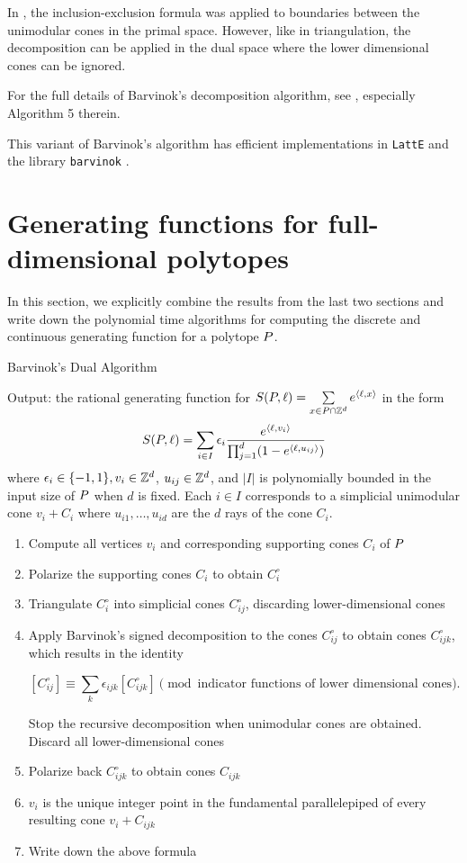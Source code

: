 In \cite{bar}, the inclusion-exclusion formula was applied to boundaries between the unimodular cones in the primal space. However, like in triangulation, the decomposition can be applied in the dual space where the lower dimensional cones can be ignored. 

For the full details of Barvinok's decomposition algorithm, see \cite{latte1}, especially Algorithm 5 therein.

This variant of Barvinok’s algorithm has
efficient implementations in \texttt{LattE}  \cite{latte-1.2} and the library \texttt{barvinok} \cite{barvinok-noversion}.


\section{Generating functions for full-dimensional polytopes}

In this section, we explicitly combine the results from the last two sections and write down the polynomial time algorithms for computing the discrete and continuous generating function for a polytope ${ P}$.

\begin{algorithm}
\caption{Barvinok's Dual Algorithm}
\label{alg:barvinok-dual}
\begin{justify}
Output: the rational generating function for $S({ P}, \ell) = \sum\limits_{x \in { P} \cap {\mathbb Z}^d} e^{\langle \ell, x \rangle}$ in the form
\[S({ P},\ell) = \sum_{i \in I} \epsilon_i \frac{e^{\langle \ell, v_i \rangle}}{\prod_{j=1}^d ( 1 - e^{\langle \ell, u_{ij}\rangle})}\] 
where $\epsilon_i \in \{-1,1\}, v_i \in {\mathbb Z}^d$, $u_{ij} \in {\mathbb Z}^d$, and $|I|$ is polynomially bounded in the input size of ${ P}$ when $d$ is fixed. Each $i \in I$ corresponds to a simplicial unimodular cone $v_i + C_i$ where $u_{i1}, \dots, u_{id}$ are the $d$ rays of the cone $C_i$.
\end{justify}
\begin{enumerate}
\item  Compute all vertices $v_i$ and corresponding supporting cones $C_i$ of ${ P}$
\item Polarize the supporting cones $C_i$ to obtain $C_i^\circ$
\item Triangulate $C_i^\circ$ into simplicial cones $C_{ij}^\circ$, discarding lower-dimensional cones
\item Apply Barvinok’s signed decomposition to the cones $C_{ij}^\circ$ to obtain cones $C_{ijk}^\circ$, which results in the identity

\[ [C^\circ_{ij}] \equiv \sum_{k} \epsilon_{ijk} [C^\circ_{ijk}] \pmod{\text{indicator functions of lower dimensional cones}}.\]

Stop the recursive decomposition when unimodular cones are obtained. Discard all lower-dimensional cones
\item Polarize back $C_{ijk}^\circ$ to obtain cones $C_{ijk}$
\item $v_i$ is the unique integer point in the fundamental parallelepiped of every resulting cone $v_i+C_{ijk}$
\item Write down the above formula
\end{enumerate}
\end{algorithm}

